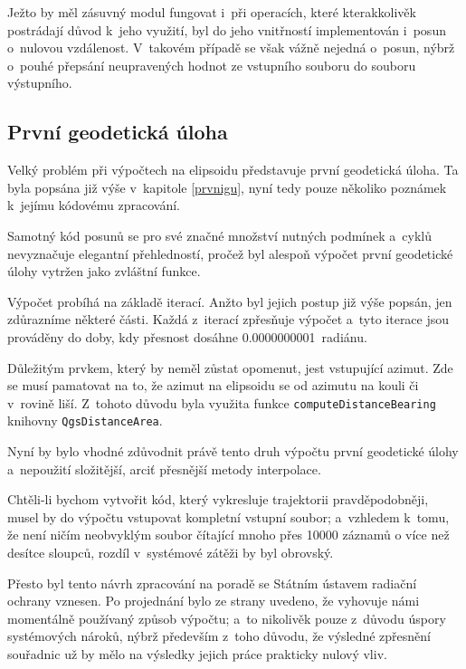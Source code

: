Ježto by měl zásuvný modul fungovat i~při
operacích, které kterakkolivěk postrádají důvod k~jeho využití, byl do jeho
vnitřností implementován i~posun o~nulovou vzdálenost.
V~takovém případě se však vážně nejedná o~posun, nýbrž o~pouhé přepsání
neupravených hodnot ze vstupního souboru do souboru výstupního. 

\subsection{První geodetická úloha}
\label{prvniguplugin}

Velký problém při výpočtech na elipsoidu představuje první geodetická úloha. Ta byla popsána
již výše v~kapitole \ref{prvnigu}, nyní tedy pouze několiko poznámek k~jejímu kódovému zpracování. 

Samotný kód posunů se pro své značné množství nutných podmínek a~cyklů nevyznačuje
elegantní přehledností, pročež byl alespoň výpočet první geodetické úlohy vytržen jako zvláštní funkce.

Výpočet probíhá na základě iterací. Anžto byl jejich postup již výše popsán, jen zdůrazníme
některé části. Každá z~iterací zpřesňuje výpočet a~tyto iterace jsou prováděny do doby,
kdy přesnost dosáhne 0.0000000001~radiánu. 

Důležitým prvkem, který by neměl zůstat opomenut, jest vstupující azimut. Zde se musí pamatovat
na to, že azimut na elipsoidu se od azimutu na kouli či v~ro\-vině liší. Z~tohoto
důvodu byla využita funkce {\tt computeDistanceBearing} knihovny {\tt QgsDistanceArea}.

Nyní by bylo vhodné zdůvodnit právě tento druh výpočtu první geodetické úlohy a~nepoužití
složitější, arciť přesnější metody interpolace. 

Chtěli-li bychom vytvořit kód, který vykresluje trajektorii pravděpodobněji, mu\-sel by do
výpočtu vstupovat kompletní vstupní soubor; a~vzhledem k~tomu, že není ničím neobvyklým
soubor čítající mnoho přes 10000 záznamů o více než desítce sloupců, rozdíl v~systémové zátěži
by byl obrovský. 

Přesto byl tento návrh zpraco\-vá\-ní na poradě se Státním ústavem radiační ochra\-ny
vznesen. Po projednání bylo ze strany  uvedeno, že vyhovuje námi momentálně
používaný způsob výpočtu; a~to nikolivěk pouze z~důvodu úspory systémových nároků, nýbrž především
z~toho důvodu, že výsledné zpřesnění souřadnic už by mělo na výsledky jejich práce
prakticky nulový vliv. 

